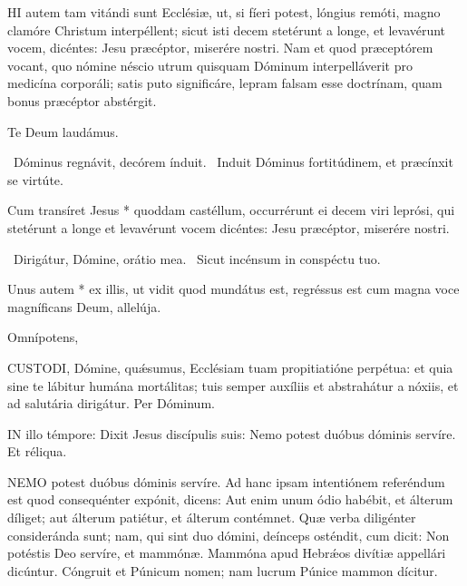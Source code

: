 
\lettrine[lines=2]{H}{I} autem tam vitándi sunt Ecclésiæ, ut, si fíeri potest, lóngius remóti, magno clamóre Christum interpéllent; sicut isti decem stetérunt a longe, et levavérunt vocem, dicéntes: Jesu præcéptor, miserére nostri. Nam et quod præceptórem vocant, quo nómine néscio utrum quisquam Dóminum interpelláverit pro medicína corporáli; satis puto significáre, lepram falsam esse doctrínam, quam bonus præcéptor abstérgit.

Te Deum laudámus.


\V\ Dóminus regnávit, decórem índuit. \R\ Induit Dóminus fortitúdinem, et præcínxit se virtúte.

 Cum transíret Jesus * quoddam castéllum, occurrérunt ei decem viri leprósi, qui stetérunt a longe et levavérunt vocem dicéntes: Jesu præcéptor, miserére nostri.


\V\ Dirigátur, Dómine, orátio mea. \R\ Sicut incénsum in conspéctu tuo.

 Unus autem * ex illis, ut vidit quod mundátus est, regréssus est cum magna voce magníficans Deum, allelúja.

 Omnípotens, 




\lettrine[lines=2]{C}{USTODI}, Dómine, quǽsumus, Ecclésiam tuam propitiatióne perpétua: et quia sine te lábitur humána mortálitas; tuis semper auxíliis et abstrahátur a nóxiis, et ad salutária dirigátur. Per Dóminum.




\lettrine[lines=2]{I}{N} illo témpore: Dixit Jesus discípulis suis: Nemo potest duóbus dóminis servíre. Et réliqua.



\lettrine[lines=2]{N}{EMO} potest duóbus dóminis servíre. Ad hanc ipsam intentiónem referéndum est quod consequénter expónit, dicens: Aut enim unum ódio habébit, et álterum díliget; aut álterum patiétur, et álterum contémnet. Quæ verba diligénter consideránda sunt; nam, qui sint duo dómini, deínceps osténdit, cum dicit: Non potéstis Deo servíre, et mammónæ. Mammóna apud Hebrǽos divítiæ appellári dicúntur. Cóngruit et Púnicum nomen; nam lucrum Púnice mammon dícitur.

